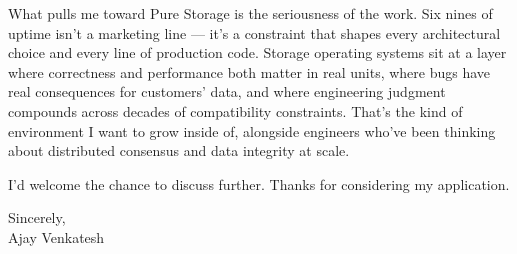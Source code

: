 \documentclass[letterpaper,11pt]{article}
\begin{document}
What pulls me toward Pure Storage is the seriousness of the work. Six nines of uptime isn't a marketing line --- it's a constraint that shapes every architectural choice and every line of production code. Storage operating systems sit at a layer where correctness and performance both matter in real units, where bugs have real consequences for customers' data, and where engineering judgment compounds across decades of compatibility constraints. That's the kind of environment I want to grow inside of, alongside engineers who've been thinking about distributed consensus and data integrity at scale.

I'd welcome the chance to discuss further. Thanks for considering my application.

\vspace{12pt}

Sincerely, \\
Ajay Venkatesh
\end{document}
